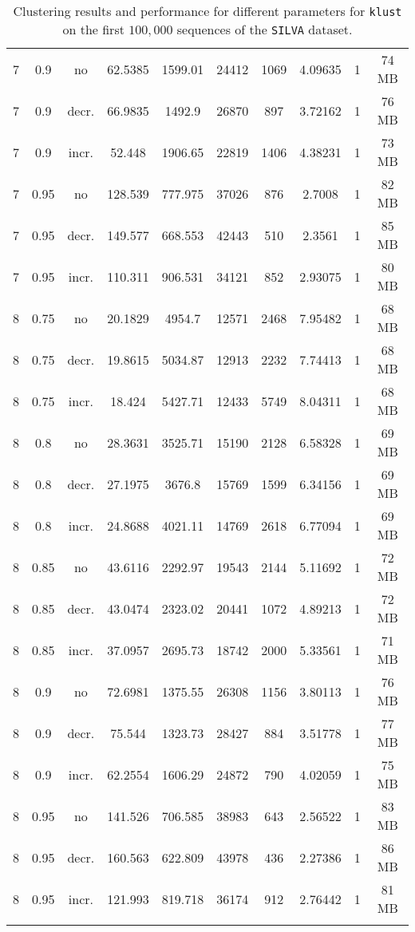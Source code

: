 \begin{longtable}{c|c|c|c|c|c|c|c|c|c}
  \hline
  7   &  0.9   & no    & 62.5385  &  1599.01  &  24412  &  1069  &  4.09635  &  1  &  74  MB \\
  7   &  0.9   & decr. & 66.9835  &  1492.9   &  26870  &  897   &  3.72162  &  1  &  76  MB \\
  7   &  0.9   & incr. & 52.448   &  1906.65  &  22819  &  1406  &  4.38231  &  1  &  73  MB \\
  \hline
  7   &  0.95  & no    & 128.539  &  777.975  &  37026  &  876   &  2.7008   &  1  &  82  MB \\
  7   &  0.95  & decr. & 149.577  &  668.553  &  42443  &  510   &  2.3561   &  1  &  85  MB \\
  7   &  0.95  & incr. & 110.311  &  906.531  &  34121  &  852   &  2.93075  &  1  &  80  MB \\
  \hline
  8   &  0.75  & no    & 20.1829  &  4954.7   &  12571  &  2468  &  7.95482  &  1  &  68  MB \\
  8   &  0.75  & decr. & 19.8615  &  5034.87  &  12913  &  2232  &  7.74413  &  1  &  68  MB \\
  8   &  0.75  & incr. & 18.424   &  5427.71  &  12433  &  5749  &  8.04311  &  1  &  68  MB \\
  \hline
  8   &  0.8   & no    & 28.3631  &  3525.71  &  15190  &  2128  &  6.58328  &  1  &  69  MB \\
  8   &  0.8   & decr. & 27.1975  &  3676.8   &  15769  &  1599  &  6.34156  &  1  &  69  MB \\
  8   &  0.8   & incr. & 24.8688  &  4021.11  &  14769  &  2618  &  6.77094  &  1  &  69  MB \\
  \hline
  8   &  0.85  & no    & 43.6116  &  2292.97  &  19543  &  2144  &  5.11692  &  1  &  72  MB \\
  8   &  0.85  & decr. & 43.0474  &  2323.02  &  20441  &  1072  &  4.89213  &  1  &  72  MB \\
  8   &  0.85  & incr. & 37.0957  &  2695.73  &  18742  &  2000  &  5.33561  &  1  &  71  MB \\
  \hline
  8   &  0.9   & no    & 72.6981  &  1375.55  &  26308  &  1156  &  3.80113  &  1  &  76  MB \\
  8   &  0.9   & decr. & 75.544   &  1323.73  &  28427  &  884   &  3.51778  &  1  &  77  MB \\
  8   &  0.9   & incr. & 62.2554  &  1606.29  &  24872  &  790   &  4.02059  &  1  &  75  MB \\
  \hline
  8   &  0.95  & no    & 141.526  &  706.585  &  38983  &  643   &  2.56522  &  1  &  83  MB \\
  8   &  0.95  & decr. & 160.563  &  622.809  &  43978  &  436   &  2.27386  &  1  &  86  MB \\
  8   &  0.95  & incr. & 121.993  &  819.718  &  36174  &  912   &  2.76442  &  1  &  81  MB \\
  \caption{Clustering results and performance for different parameters for
    \texttt{klust} on the first $100,000$ sequences of the \texttt{SILVA} dataset.}
  \label{fig:klust_results_params}
\end{longtable}
\endgroup


